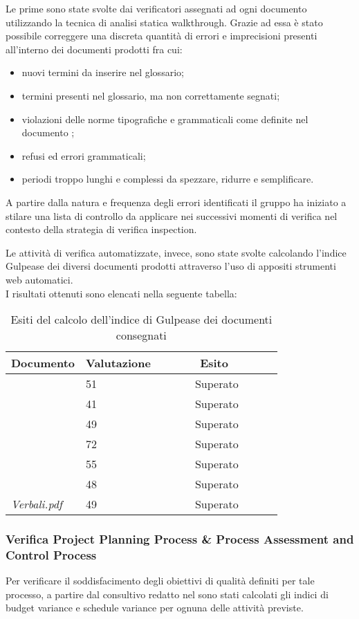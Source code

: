 		Le prime sono state svolte dai verificatori assegnati ad ogni documento utilizzando la tecnica di 					analisi statica walkthrough. Grazie ad essa è stato possibile correggere una discreta quantità di errori e imprecisioni presenti all'interno dei documenti prodotti fra cui: 
		\begin{itemize}	
			\item nuovi termini da inserire nel glossario;
			\item termini presenti nel glossario, ma non correttamente segnati;
			\item violazioni delle norme tipografiche e grammaticali come definite nel documento \NdP;
			\item refusi ed errori grammaticali;
			\item periodi troppo lunghi e complessi da spezzare, ridurre e semplificare.
		\end{itemize}
		A partire dalla natura e frequenza degli errori identificati il gruppo ha iniziato a stilare una lista
		di controllo da applicare nei successivi momenti di verifica nel contesto della strategia di verifica
		inspection.

		Le attività di verifica automatizzate, invece, sono state svolte calcolando l'indice Gulpease dei 	
		diversi documenti prodotti attraverso l'uso di appositi strumenti web automatici. 
		\\I risultati ottenuti sono elencati nella seguente tabella:
		\begin{table}[H]
		\begin{tabular}{|l|l|l|}
		\hline
		\textbf{Documento} 		&\textbf{Valutazione} &\textbf{~~~~~~Esito~~~~~~} \\
		\hline
		\PdQ 					&51		&~~~~~~Superato~~~~~~\\
		\NdP 					&41		&~~~~~~Superato~~~~~~\\
		\SdF 					&49		&~~~~~~Superato~~~~~~\\	
		\AdR 					&72		&~~~~~~Superato~~~~~~\\
		\PdP 					&55		&~~~~~~Superato~~~~~~\\
		\Glossario 				&48		&~~~~~~Superato~~~~~~\\
		\textit{Verbali.pdf} 		&49		&~~~~~~Superato~~~~~~\\
		\hline
		\end{tabular}
		\caption{Esiti del calcolo dell'indice di Gulpease dei documenti consegnati}
		\end{table}
		
		\subsubsection{Verifica Project Planning Process \& Process Assessment and Control Process}
		Per verificare il soddisfacimento degli obiettivi di qualità definiti per tale processo, a partire dal 				consultivo redatto nel \PdP{} sono stati calcolati gli indici di budget variance e schedule variance per ognuna delle attività previste.
		

